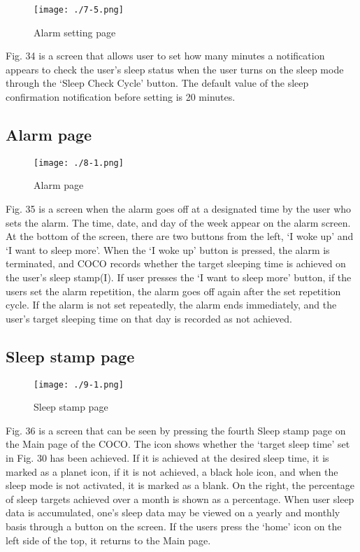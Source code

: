 \documentclass[conference]{IEEEtran}
\begin{document}
\begin{figure}[H]
\texttt{[image: ./7-5.png]}
\centering
\caption{Alarm setting page}
\end{figure}

Fig. 34 is a screen that allows user to set how many minutes a notification appears to check the user's sleep status when the user turns on the sleep mode through the ‘Sleep Check Cycle’ button. The default value of the sleep confirmation notification before setting is 20 minutes.

\subsection{Alarm page}
\begin{figure}[H]
\texttt{[image: ./8-1.png]}
\centering
\caption{Alarm page}
\end{figure}

Fig. 35 is a screen when the alarm goes off at a designated time by the user who sets the alarm. The time, date, and day of the week appear on the alarm screen. At the bottom of the screen, there are two buttons from the left, ‘I woke up’ and ‘I want to sleep more’. When the ‘I woke up’ button is pressed, the alarm is terminated, and COCO records whether the target sleeping time is achieved on the user's sleep stamp(I). If user presses the ‘I want to sleep more’ button, if the users set the alarm repetition, the alarm goes off again after the set repetition cycle. If the alarm is not set repeatedly, the alarm ends immediately, and the user's target sleeping time on that day is recorded as not achieved.

\subsection{Sleep stamp page}
\begin{figure}[H]
\texttt{[image: ./9-1.png]}
\centering
\caption{Sleep stamp page}
\end{figure}

Fig. 36 is a screen that can be seen by pressing the fourth Sleep stamp page on the Main page of the COCO. The icon shows whether the ‘target sleep time’ set in Fig. 30 has been achieved. If it is achieved at the desired sleep time, it is marked as a planet icon, if it is not achieved, a black hole icon, and when the sleep mode is not activated, it is marked as a blank. On the right, the percentage of sleep targets achieved over a month is shown as a percentage. When user sleep data is accumulated, one's sleep data may be viewed on a yearly and monthly basis through a button on the screen. If the users press the ‘home’ icon on the left side of the top, it returns to the Main page.
\end{document}
